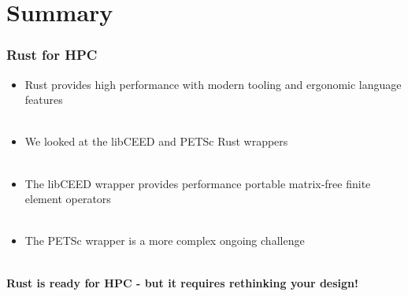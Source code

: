 \documentclass{beamer}
\begin{document}
\section{Summary}

\begin{frame}
\begin{center}
\frametitle{Rust for HPC}

\begin{itemize}

\item Rust provides high performance with modern tooling and ergonomic language features\\

~\\

\item We looked at the libCEED and PETSc Rust wrappers\\

~\\

\item The libCEED wrapper provides performance portable matrix-free finite element operators\\

~\\

\item The PETSc wrapper is a more complex ongoing challenge\\

\end{itemize}

~\\

\bf{Rust is ready for HPC - but it requires rethinking your design!}

\end{center}
\end{frame}

\end{document}
